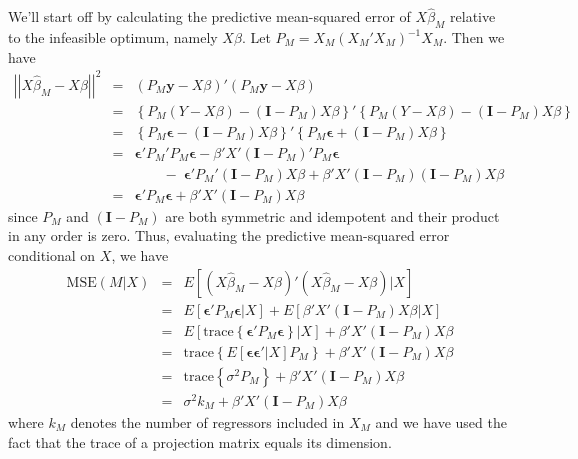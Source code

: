 We'll start off by calculating the predictive mean-squared error of $X\widehat{\beta}_M$ relative to the infeasible optimum, namely $X\beta$. Let $P_M = X_M(X_M'X_M)^{-1}X_M$. Then we have
\begin{eqnarray*}
	\left|\left|X\widehat{\beta}_M - X\beta\right|\right|^2 &=& (P_M \mathbf{y} - X\beta)'(P_M \mathbf{y} - X\beta)\\
		&=&\left\{P_M(Y-X\beta) - (\mathbf{I} - P_M)X\beta \right\}' \left\{P_M(Y-X\beta) - (\mathbf{I} - P_M)X\beta  \right\}\\
		&=&\left\{ P_M \boldsymbol{\epsilon} - (\mathbf{I}- P_M)X\beta\right\}'\left\{ P_M \boldsymbol{\epsilon} + (\mathbf{I}- P_M)X\beta \right\}\\
		&=&\boldsymbol{\epsilon}'P_M'P_M \boldsymbol{\epsilon} - \beta'X'(\mathbf{I}-P_M)'P_M\boldsymbol{\epsilon} \\
			&&\quad \quad - \;\boldsymbol{\epsilon}'P_M'(\mathbf{I} - P_M)X\beta + \beta'X' (\mathbf{I} - P_M)(\mathbf{I} - P_M)X\beta\\
		&=& \boldsymbol{\epsilon}'P_M \boldsymbol{\epsilon} + \beta'X'(\mathbf{I} - P_M)X\beta
\end{eqnarray*}
since $P_M$ and $(\mathbf{I} - P_M)$ are both symmetric and idempotent and their product in any order is zero. Thus, evaluating the predictive mean-squared error conditional on $X$, we have
	\begin{eqnarray*}
		\mbox{MSE}(M|X) &=& E\left[(X\widehat{\beta}_M - X\beta)'(X\widehat{\beta}_M - X\beta)|X \right]\\
		 &=& E\left[\boldsymbol{\epsilon}'P_M \boldsymbol{\epsilon}|X\right] + E\left[\beta'X'(\mathbf{I} - P_M)X\beta |X\right]\\
			&=&E\left[\mbox{trace}\left\{\boldsymbol{\epsilon}'P_M \boldsymbol{\epsilon}\right\}|X\right] + \beta'X'(\mathbf{I} - P_M)X\beta \\
		&=&\mbox{trace}\left\{E[\boldsymbol{\epsilon} \boldsymbol{\epsilon}'|X]P_M\right\} + \beta'X'(\mathbf{I} - P_M)X\beta \\
	&=&\mbox{trace}\left\{\sigma^2 P_M\right\} + \beta'X'(\mathbf{I} - P_M)X\beta \\
	&=& \sigma^2 k_M + \beta'X'(\mathbf{I} - P_M)X\beta
	\end{eqnarray*}
where $k_M$ denotes the number of regressors included in $X_M$ and we have used the fact that the trace of a projection matrix equals its dimension. 

